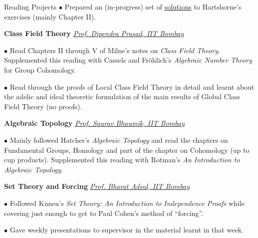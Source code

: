 \begin{rubric}{Reading Projects}
	$\bullet$ Prepared an (in-progress) set of \href{https://swayamchube.github.io/math/hartshorne-solutions/main.pdf}{solutions} to Hartshorne's exercises (mainly Chapter II).


	\entry*[2024\phantom{}] \textbf{Class Field Theory} \hfill \emph{\href{mailto:dprasad@iitb.ac.in}{Prof. Dipendra Prasad, IIT Bombay}}

	$\bullet$ Read Chapters II through V of Milne's notes on \emph{Class Field Theory}. Supplemented this reading with Cassels and Fr\"ohlich's \emph{Algebraic Number Theory} for Group Cohomology.

	$\bullet$ Read through the proofs of Local Class Field Theory in detail and learnt about the adelic and ideal theoretic formulation of the main results of Global Class Field Theory (no proofs).


	\entry*[2023\phantom{}] \textbf{Algebraic Topology} \hfill \emph{\href{mailto:saurav@math.iitb.ac.in}{Prof. Saurav Bhaumik, IIT Bombay}}

	$\bullet$ Mainly followed Hatcher's \emph{Algebraic Topology} and read the chapters on Fundamental Groups, Homology and part of the chapter on Cohomology (up to cup products). Supplemented this reading with Rotman's \emph{An Introduction to Algebraic Topology}.


	\entry*[2023\phantom{}] \textbf{Set Theory and Forcing} \hfill \emph{\href{mailto:adsul@cse.iitb.ac.in}{Prof. Bharat Adsul, IIT Bombay}}

	$\bullet$ Followed Kunen's \emph{Set Theory: An Introduction to Independence Proofs} while covering just enough to get to Paul Cohen's method of ``forcing''.

	$\bullet$ Gave weekly presentations to supervisor in the material learnt in that week.
\end{rubric}